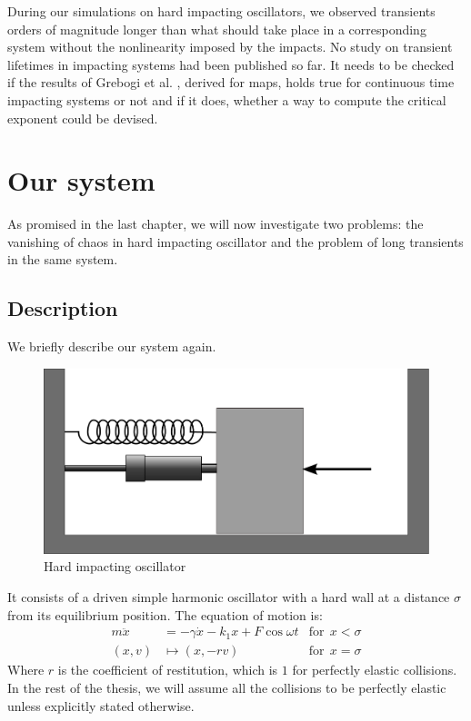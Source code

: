 \documentclass{book}
\renewcommand{\(}{\begin{columns}}
\renewcommand{\)}{\end{columns}}
\newcommand{\<}[1]{\begin{column}{#1}}
\renewcommand{\>}{\end{column}}
\begin{document}
During our simulations on hard impacting oscillators, we observed transients 
orders of magnitude longer than what should take place in a corresponding system 
without the nonlinearity imposed by the impacts. No study on transient 
lifetimes in impacting systems had been published so far.  It needs to be 
checked if the results of 
Grebogi et al. \cite{grebogi-transient}, derived for maps,  holds true for 
continuous time impacting systems or 
not and if it does, whether a way to compute the critical exponent could be 
devised.  

\chapter{Our system}
As promised in the last chapter, we will now investigate two problems: the 
vanishing of chaos in hard impacting oscillator and the problem of long 
transients in the same system.  
\section{Description}
We briefly describe our system again.  
\begin{figure}[!hbp]
\caption{Hard impacting oscillator}
\begin{center}
\includegraphics[width=0.5\columnwidth]{hardcol}
\end{center}
\end{figure}

It consists of a driven simple harmonic oscillator with a hard wall at a distance 
$\sigma$ from its equilibrium position.   The equation of motion is:
\begin{align}
\label{eq-hard_impact2}
m\ddot{x}&=-\gamma \dot{x}-k_1x+F\cos{\omega t}&\mathrm{for}~~x<\sigma\\
(x,v)&\mapsto (x,-rv)&\mathrm{for}~~x=\sigma
\end{align}
Where $r$ is the coefficient of restitution, which is $1$ for perfectly 
elastic collisions.  In the rest of the thesis, we will assume all the 
collisions to be perfectly elastic unless explicitly stated otherwise.  
\end{document}
